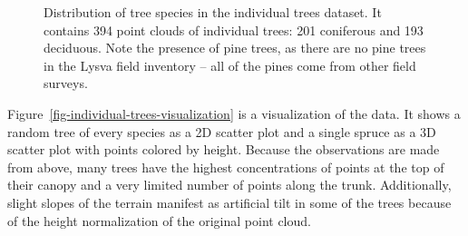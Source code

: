 \begin{figure}
\caption[Distribution of tree species in the individual trees dataset]{\label{fig-individual-trees-species-distribution}Distribution
of tree species in the individual trees dataset. It contains 394 point
clouds of individual trees: 201 coniferous and 193 deciduous. Note the
presence of pine trees, as there are no pine trees in the Lysva field
inventory -- all of the pines come from other field surveys.}
\end{figure}


Figure~\ref{fig-individual-trees-visualization} is a visualization of the data.
It shows a random tree of every species as a 2D scatter plot and a single spruce as a 3D scatter plot with points colored by height.
Because the observations are made from above, many trees have the highest concentrations of points at the top of their canopy and a very limited number of points along the trunk.
Additionally, slight slopes of the terrain manifest as artificial tilt in some of the trees because of the height normalization of the original point cloud.

